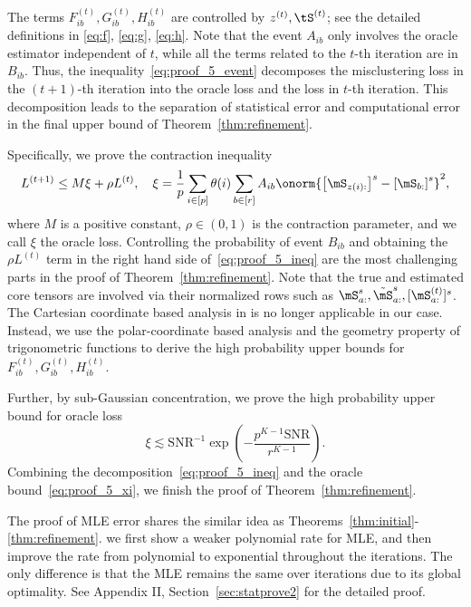 \documentclass[lettersize,onecolumn,journal]{IEEEtran}
\theoremstyle{definition}
\theoremstyle{definition}
\newcommand{\of}[1]{\left(#1\right)}
\newcommand{\off}[1]{\left[#1\right]}
\begin{document}
The terms $F_{ib}^{(t)}, G_{ib}^{(t)}, H_{ib}^{(t)}$ are controlled by $z^{(t)}, \tS^{(t)}$; see the detailed definitions in \eqref{eq:f}, \eqref{eq:g}, \eqref{eq:h}. Note that the event $A_{ib}$ only involves the oracle estimator independent of $t$, while all the terms related to the $t$-th iteration are in $B_{ib}$. Thus, the inequality~\eqref{eq:proof_5_event} decomposes the misclustering loss in the $(t+1)$-th iteration into the oracle loss and the loss in $t$-th iteration. This decomposition leads to the separation of statistical error and computational error in the final upper bound of Theorem~\ref{thm:refinement}.

Specifically, we prove the contraction inequality
\begin{equation}\label{eq:proof_5_ineq}
    L^{(t+1)} \leq M \xi + \rho L^{(t)}, \quad \xi = \frac{1}{p}  \sum_{i \in [p]} \theta(i) \sum_{b \in [r]}  A_{ib} \onorm{ \off{ \mS_{ z(i):}  }^s - \off{ \mS_{b:}  }^s  }^2,
\end{equation}
where $M$ is a positive constant, $\rho \in (0,1)$ is the contraction parameter, and we call $\xi$ the oracle loss. Controlling the probability of event $B_{ib}$ and obtaining the $\rho L^{(t)}$ term in the right hand side of~\eqref{eq:proof_5_ineq} are the most challenging parts in the proof of Theorem~\ref{thm:refinement}. Note that the true and estimated core tensors are involved via their normalized rows such as $\mS_{a:}^s, \tilde \mS_{a:}^s, [\mS^{(t)}_{a:}]^s$. The Cartesian coordinate based analysis in \cite{han2020exact} is no longer applicable in our case. Instead, we use the polar-coordinate based analysis and the geometry property of trigonometric functions to derive the high probability upper bounds for $F_{ib}^{(t)}, G_{ib}^{(t)}, H_{ib}^{(t)}$. 

Further, by sub-Gaussian concentration, we prove the high probability upper bound for oracle loss
\begin{equation}\label{eq:proof_5_xi}
    \xi  \lesssim {\text{SNR}^{-1}}\exp\of{- \frac{p^{K-1}\text{SNR}}{r^{K-1}}}.
\end{equation}
Combining the decomposition~\eqref{eq:proof_5_ineq} and the oracle bound~\eqref{eq:proof_5_xi}, we finish the proof of Theorem~\ref{thm:refinement}.

{\color{blue}
The proof of MLE error shares the similar idea as Theorems~\ref{thm:initial}-\ref{thm:refinement}. we first show a weaker polynomial rate for MLE, and then improve the rate from polynomial to exponential throughout the iterations. The only difference is that the MLE remains the same over iterations due to its global optimality. See Appendix II, Section~\ref{sec:statprove2} for the detailed proof.}
\end{document}
